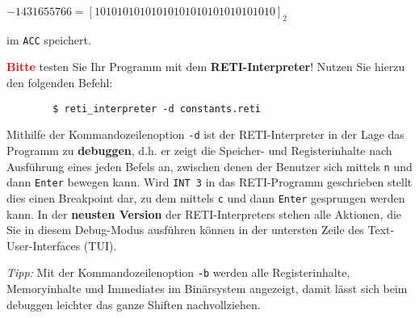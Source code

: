 \documentclass{article}
\begin{document}
	$-1431655766 = [10101010101010101010101010101010]_2$

	im \texttt{ACC} speichert.

  {\LARGE\bfseries\textcolor{red}{Bitte}} testen Sie Ihr Programm mit dem \textbf{RETI-Interpreter}! Nutzen Sie hierzu den folgenden Befehl:
	\begin{verbatim}
		$ reti_interpreter -d constants.reti
	\end{verbatim}

  {\color{green}
Mithilfe der Kommandozeilenoption \verb|-d| ist der RETI-Interpreter in der Lage das Programm zu \textbf{debuggen}, d.h. er zeigt die Speicher- und Registerinhalte nach Ausführung eines jeden Befels an, zwischen denen der Benutzer sich mittels \verb|n| und dann \verb|Enter| bewegen kann. Wird \verb|INT 3| in das RETI-Programm geschrieben stellt dies einen Breakpoint dar, zu dem mittels \verb|c| und dann \verb|Enter| gesprungen werden kann. In der \textbf{neusten Version} der RETI-Interpreters stehen alle Aktionen, die Sie in diesem Debug-Modus ausführen können in der untersten Zeile des Text-User-Interfaces (TUI).

\textit{Tipp:} Mit der Kommandozeilenoption \verb|-b| werden alle Registerinhalte, Memoryinhalte und Immediates im Binärsystem angezeigt, damit lässt sich beim debuggen leichter das ganze Shiften nachvollziehen.
}

\end{document}

